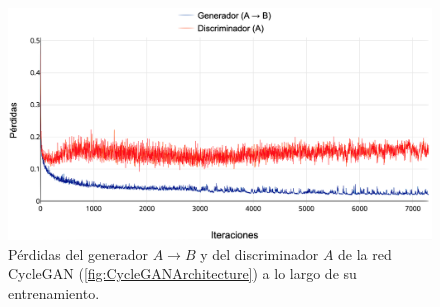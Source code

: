 
\begin{figure}
    \centering
    \includegraphics[width=\textwidth]{Images/CycleGAN_metrics.png}
    \caption{Pérdidas del generador $A\rightarrow B$ y del discriminador $A$ de la red CycleGAN (\autoref{fig:CycleGANArchitecture}) a lo largo de su entrenamiento.}
    \label{fig:CycleGAN_metrics}
\end{figure}